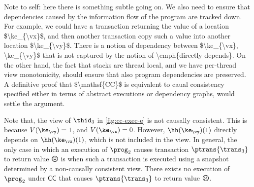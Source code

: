 \ac{Note to self: here there is something subtle going on. We also need to ensure that dependencies 
caused by the information flow of the program are tracked down. For example, we could have a 
transaction returning the value of a location $\ke_{\vx}$, and then another transaction copy such a value 
into another location $\ke_{\vy}$. There is a notion of dependency between $\ke_{\vx}, \ke_{\vy}$ that 
is not captured by the notion of \emph{directly depends}. On the other hand, the fact that 
stacks are thread local, and we have per-thread view monotonicity, should ensure that also program 
dependencies are preserved. A definitive proof that $\mathsf{CC}$ is equivalent to caual consistency 
specified either in terms of abstract executions or dependency graphs, would settle the argument.}

Note that, the view of $\thid_3$ in \cref{fig:cc-exec-e} is not causally consistent.
This is because $V(\ke_{\vy}) = 1$, and $V(\ke_{\vx}) = 0$. However, $\hh(\ke_{\vy})(1)$ directly depends 
on $\hh(\ke_{\vx})(1)$, which is not included in the view. 
In general, the only case in which an execution of $\prog_2$ causes transaction $\ptrans{\trans_3}$ to return value $\sadface$ is when such a transaction is executed using a snapshot determined by a non-causally consistent view. 
There exists no execution of $\prog_2$ under $\mathsf{CC}$ that causes $\ptrans{\trans_3}$ to return value $\sadface$.


%
